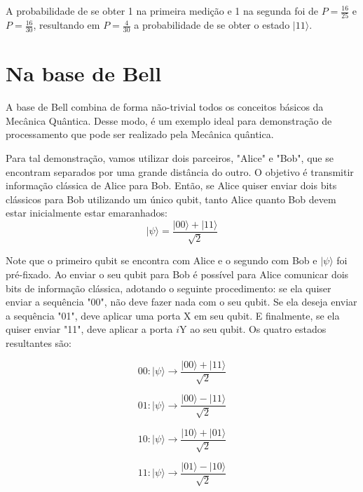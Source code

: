 \documentclass[tcc,capa]{texufpel}
\begin{document}
A probabilidade de se obter 1 na primeira medição e 1 na segunda foi de $P=\frac{16}{25}$ e $P=\frac{16}{30}$, resultando em $P=\frac{4}{30}$ a probabilidade de se obter o estado $|11\rangle$. 


\section{Na base de Bell}

A base de Bell combina de forma não-trivial todos os conceitos básicos da Mecânica Quântica. Desse modo, é um exemplo ideal para demonstração de processamento que pode ser realizado pela Mecânica quântica.

Para tal demonstração, vamos utilizar dois parceiros, "Alice" e "Bob", que se encontram separados por uma grande distância do outro. O objetivo é transmitir informação clássica de Alice para Bob. Então, se Alice quiser enviar dois bits clássicos para Bob utilizando um único qubit, tanto Alice quanto Bob devem estar inicialmente estar emaranhados:
\begin{equation}
    |\psi\rangle = \frac{|00\rangle+|11\rangle}{\sqrt{2}}
\end{equation}

Note que o primeiro qubit se encontra com Alice e o segundo com Bob e $|\psi\rangle$ foi  pré-fixado. Ao enviar o seu qubit para Bob é possível para Alice comunicar dois bits de informação clássica, adotando o seguinte procedimento: se ela quiser enviar a sequência "00", não deve fazer nada com o seu qubit. Se ela deseja enviar a sequência "01", deve aplicar uma porta X em seu qubit. E finalmente, se ela quiser enviar "11", deve aplicar a porta $i$Y ao seu qubit. Os quatro estados resultantes são:

\begin{equation}
    00: |\psi\rangle \rightarrow \frac{|00\rangle+|11\rangle}{\sqrt{2}}
\end{equation}

\begin{equation}
   01: |\psi\rangle \rightarrow \frac{|00\rangle-|11\rangle}{\sqrt{2}}
\end{equation}

\begin{equation}
    10: |\psi\rangle \rightarrow \frac{|10\rangle+|01\rangle}{\sqrt{2}}
\end{equation}

\begin{equation}    
    11: |\psi\rangle \rightarrow \frac{|01\rangle-|10\rangle}{\sqrt{2}}
\end{equation}
    
\end{document}
